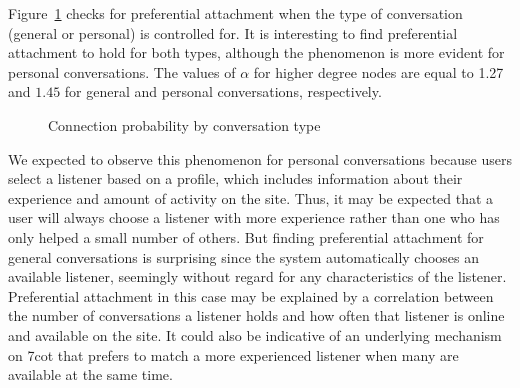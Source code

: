 Figure~\ref{PA-gen-pers} checks for preferential attachment when the type of conversation
(general or personal) is controlled for. 
It is interesting to find preferential attachment to hold for both types, although 
the phenomenon is more evident for personal
conversations. The values of $\alpha$ for
higher degree nodes are equal to 1.27$ $ and $ 1.45$ for
general and personal conversations, respectively.
\begin{figure}[htb]

\centering
{}
\caption{Connection probability by conversation type}
\label{PA-gen-pers}
\end{figure}
We expected to observe this phenomenon for personal conversations 
because users select a listener based on a profile, which includes information about
their experience and amount of activity on the site. Thus, it may be expected that a user
will always choose a listener with more experience rather than one who has only helped a small
number of others. But finding preferential attachment 
for general conversations is surprising since the system automatically chooses an 
available listener, seemingly without regard for any characteristics of the listener.
Preferential attachment in this case may be explained by a 
correlation between the number of conversations a listener holds and how often that
listener is online and available on the site. It could also be indicative of an underlying
mechanism on 7cot that prefers to match a more experienced listener 
when many are available at the same time. 

